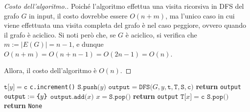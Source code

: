 \documentclass[a4paper, 12pt]{report}
\begin{document}
    \begin{proof}[Costo dell'algoritmo.]
        Poiché l'algoritmo effettua una visita ricorsiva in DFS del grafo $G$ in input, il costo dovrebbe essere $O(n + m)$, ma l'unico caso in cui viene effettuata una visita completa del grafo è nel caso peggiore, ovvero quando il grafo è aciclico. Si noti però che, se $G$ è aciclico, si verifica che $m := |E(G)| = n - 1$, e dunque $O(n + m) = O(n + n - 1) = O(2n - 1) = O(n)$.

        Allora, il costo dell'algoritmo è $O(n)$.
    \end{proof}

    \begin{algorithm}[H]
        \caption{
            Dato un grafo diretto $G$, rappresentato attraverso liste di adiacenza, l'algoritmo restituisce un suo ciclo, se presente.\\
            \textbf{Input}: $G$ grafo diretto, rappresentato attraverso liste di adiacenza.\\
            \textbf{Output}: un ciclo di $G$, se presente.
        }

        \begin{algorithmic}[1]
            \label{findCycleDir}
                        \State $\texttt{t[}y\texttt{]} = \texttt{c}$
                        \State \texttt{c.increment()}
                        \State $\texttt{S.push(}y\texttt{)}$
                        \State $\texttt{output} = \texttt{DFS(}G, y, \texttt{t}, \texttt{T}, \texttt{S}, \texttt{c)}$
                            \State \textbf{return} \texttt{output}
                        \EndIf
                        \State $\texttt{output} := \verb|{| y \verb|}|$ 
                            \State $\texttt{output.add(}x\texttt{)}$
                            \State $x = \texttt{S.pop()}$
                        \EndWhile
                        \State \textbf{return} \texttt{output}
                    \EndIf
                \EndFor
                \State $\texttt{T[}x\texttt{]} = \texttt{c}$
                \State $\texttt{S.pop()}$
                \State \textbf{return} \texttt{None}
            \EndFunction
        \end{algorithmic}
    \end{algorithm}
\end{document}
